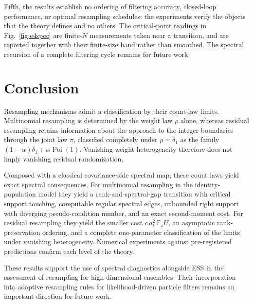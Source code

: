 \documentclass[lettersize,journal]{IEEEtran}
\theoremstyle{remark}
\begin{document}
Fifth, the results establish no ordering of filtering accuracy, closed-loop
performance, or optimal resampling schedules: the experiments verify the
objects that the theory defines and no others. The critical-point readings in
Fig.~\ref{fig:e4spec} are finite-$N$ measurements taken near a transition, and
are reported together with their finite-size band rather than smoothed. The
spectral recursion of a complete filtering cycle remains for future work.


\section{Conclusion}
\label{sec:conclusion}

Resampling mechanisms admit a classification by their count-law limits.
Multinomial resampling is determined by the weight law $\rho$ alone, whereas
residual resampling retains information about the approach to the integer
boundaries through the joint law $\pi$, classified completely under
$\rho=\delta_1$ as the family
$(1-\alpha)\delta_1+\alpha\operatorname{Poi}(1)$. Vanishing weight
heterogeneity therefore does not imply vanishing residual randomization.

Composed with a classical covariance-side spectral map, these count laws yield
exact spectral consequences. For multinomial resampling in the
identity-population model they yield a rank-and-spectral-gap transition with
critical support touching, computable regular spectral edges, unbounded right
support with diverging pseudo-condition number, and an exact second-moment
cost. For residual resampling they yield the smaller cost
$c\,a_1^2\,\mathbb{E}_\pi U$, an asymptotic rank-preservation ordering, and a
complete one-parameter classification of the limits under vanishing
heterogeneity. Numerical experiments against pre-registered predictions
confirm each level of the theory.

These results support the use of spectral diagnostics alongside ESS in the
assessment of resampling for high-dimensional ensembles. Their incorporation
into adaptive resampling rules for likelihood-driven particle filters remains
an important direction for future work.


 
\end{document}
